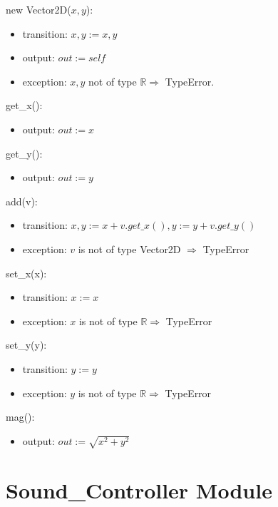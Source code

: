 \documentclass[12pt]{article}
\begin{document}
new Vector2D($x, y$):
\begin{itemize}
\item transition: $x, y := x, y$
\item output: $\mathit{out} := \mathit{self}$
\item exception: $x, y$ not of type $\mathbb{R} \Rightarrow$ TypeError.
\end{itemize}

\noindent get\_x():
\begin{itemize}
\item output: $out := x$
\end{itemize}

\noindent get\_y():
\begin{itemize}
\item output: $out := y$
\end{itemize}

\noindent add(v):
\begin{itemize}
\item transition: $x, y := x + v.get\_x(), y := y + v.get\_y()$
\item exception: $v$ is not of type Vector2D $\Rightarrow$ TypeError 
\end{itemize}

\noindent set\_x(x):
\begin{itemize}
\item transition: $x := x$
\item exception: $x$ is not of type $\mathbb{R} \Rightarrow$ TypeError
\end{itemize}

\noindent set\_y(y):
\begin{itemize}
\item transition: $y := y$
\item exception: $y$ is not of type $\mathbb{R} \Rightarrow$ TypeError
\end{itemize}

\noindent mag():
\begin{itemize}
\item output: $out := \sqrt{x^2 + y^2}$
\end{itemize}

\newpage

\section* {Sound\_Controller Module}
\end{document}
